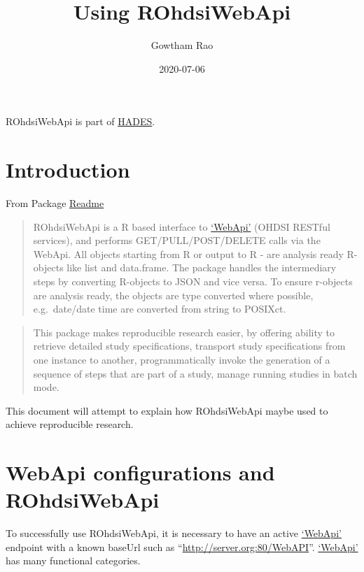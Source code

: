 \documentclass[
]{article}
\title{Using ROhdsiWebApi}
\author{Gowtham Rao}
\date{2020-07-06}
\begin{document}
\maketitle

{
\setcounter{tocdepth}{2}
\tableofcontents
}
ROhdsiWebApi is part of \href{https://ohdsi.github.io/Hades}{HADES}.

\hypertarget{introduction}{%
\section{Introduction}\label{introduction}}

From Package
\href{https://github.com/OHDSI/ROhdsiWebApi/blob/master/README.md}{Readme}

\begin{quote}
ROhdsiWebApi is a R based interface to
\href{https://github.com/ohdsi/webapi}{`WebApi'} (OHDSI RESTful
services), and performs GET/PULL/POST/DELETE calls via the WebApi. All
objects starting from R or output to R - are analysis ready R-objects
like list and data.frame. The package handles the intermediary steps by
converting R-objects to JSON and vice versa. To ensure r-objects are
analysis ready, the objects are type converted where possible,
e.g.~date/date time are converted from string to POSIXct.
\end{quote}

\begin{quote}
This package makes reproducible research easier, by offering ability to
retrieve detailed study specifications, transport study specifications
from one instance to another, programmatically invoke the generation of
a sequence of steps that are part of a study, manage running studies in
batch mode.
\end{quote}

This document will attempt to explain how ROhdsiWebApi maybe used to
achieve reproducible research.

\hypertarget{webapi-configurations-and-rohdsiwebapi}{%
\section{WebApi configurations and
ROhdsiWebApi}\label{webapi-configurations-and-rohdsiwebapi}}

To successfully use ROhdsiWebApi, it is necessary to have an active
\href{https://github.com/ohdsi/webapi}{`WebApi'} endpoint with a known
baseUrl such as ``\url{http://server.org:80/WebAPI}''.
\href{https://github.com/ohdsi/webapi}{`WebApi'} has many functional
categories.
\end{document}

